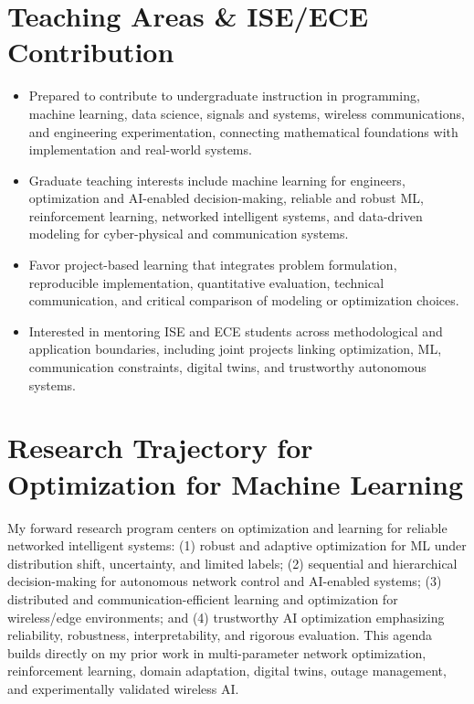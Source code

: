 \documentclass[9pt,letterpaper]{extarticle}
\begin{document}
\section{Teaching Areas \& ISE/ECE Contribution}
\begin{itemize}
\item Prepared to contribute to undergraduate instruction in programming, machine learning, data science, signals and systems, wireless communications, and engineering experimentation, connecting mathematical foundations with implementation and real-world systems.
\item Graduate teaching interests include machine learning for engineers, optimization and AI-enabled decision-making, reliable and robust ML, reinforcement learning, networked intelligent systems, and data-driven modeling for cyber-physical and communication systems.
\item Favor project-based learning that integrates problem formulation, reproducible implementation, quantitative evaluation, technical communication, and critical comparison of modeling or optimization choices.
\item Interested in mentoring ISE and ECE students across methodological and application boundaries, including joint projects linking optimization, ML, communication constraints, digital twins, and trustworthy autonomous systems.
\end{itemize}

\section{Research Trajectory for Optimization for Machine Learning}
My forward research program centers on optimization and learning for reliable networked intelligent systems: (1) robust and adaptive optimization for ML under distribution shift, uncertainty, and limited labels; (2) sequential and hierarchical decision-making for autonomous network control and AI-enabled systems; (3) distributed and communication-efficient learning and optimization for wireless/edge environments; and (4) trustworthy AI optimization emphasizing reliability, robustness, interpretability, and rigorous evaluation. This agenda builds directly on my prior work in multi-parameter network optimization, reinforcement learning, domain adaptation, digital twins, outage management, and experimentally validated wireless AI.
\end{document}
